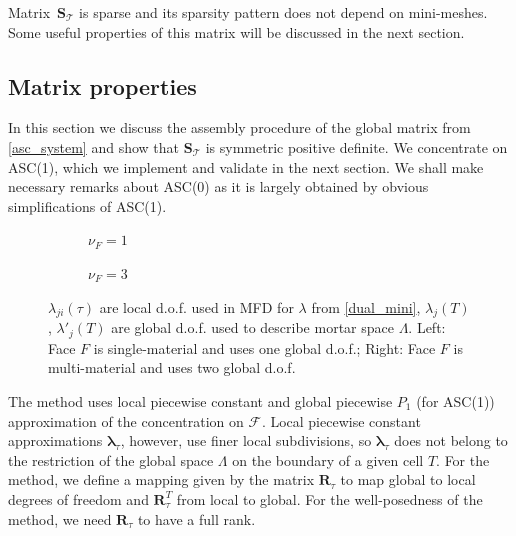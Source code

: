 \documentclass[12pt]{article}
\newcommand{\svginputw}[2][\linewidth]{\def\svgwidth{#1}} %
\newcommand{\vect}[1]{\boldsymbol{\mathbf{#1}}}
\newcommand{\bmesh}{{\vect{\mathcal T}}}
\newcommand{\mmesh}{{\vect{\mathcal \tau}}}
\newcommand{\bfaces}[1][]{{\vect{\mathcal F}_{\text{#1}}}}
\begin{document}
	Matrix~$\vect S_\bmesh$ is sparse and its sparsity pattern does not depend on mini-meshes. Some useful properties of this matrix will be discussed in the next section.
	
	\subsection{Matrix properties}
	
	In this section we discuss the assembly procedure of the global matrix from \eqref{asc_system} and show that $\vect S_\bmesh$ is symmetric positive definite. We concentrate on ASC(1), which we implement and validate  in the next section. We shall make necessary remarks about ASC(0) as it is largely obtained by obvious simplifications of ASC(1).
	
	\begin{figure}[h]
		\centering		
		\begin{subfigure}{.45\linewidth}
			\centering
			\svginputw{e_plus_1.pdf_tex}
			\caption{$\nu_F = 1$}%
			\label{fig:asc_dofs:asc1:pc}
		\end{subfigure}%
		\qquad\quad
		\begin{subfigure}{.45\linewidth}
			\centering
			\svginputw{e_plus_2.pdf_tex}
			\caption{$\nu_F = 3$}		
		\end{subfigure}
		\caption{$\lambda_{ji}(\mmesh)$ are local d.o.f. used in MFD for $\lambda$ from \eqref{dual_mini}, $\lambda_j(T)$, $\lambda'_j(T)$ are global d.o.f. used to describe mortar space $\Lambda$. Left: Face $F$ is single-material and uses one global d.o.f.; Right: Face $F$ is multi-material and uses two global d.o.f.
		\label{fig:asc_dofs:asc1:mmc}}
	\end{figure}
	
	The method uses local piecewise constant  and global piecewise $P_1$ \big(for ASC(1)\big) approximation of the concentration on $\bfaces$. Local piecewise constant approximations $\vect\lambda_\mmesh$, however, use finer local subdivisions, so $\vect\lambda_\mmesh$ does not belong to the restriction of the global space $\Lambda$ on the boundary of a given cell $T$. For the method, we define a mapping given by the matrix $\vect R_\mmesh$ to map global to local degrees of freedom and $\vect R_\mmesh^T$ from local   to global. For the well-posedness of the method, we need $\vect R_\mmesh$ to have a full rank.
	
\end{document}
